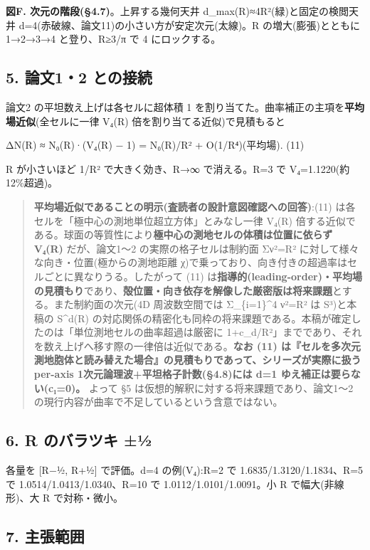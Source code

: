 \documentclass[
]{ltjsarticle}
\begin{document}
\textbf{図F. 次元の階段(§4.7)}。上昇する幾何天井
d\_max(R)≈4R²(緑)と固定の検閲天井
d=4(赤破線、論文11)の小さい方が安定次元(太線)。R の増大(膨張)とともに
1→2→3→4 と登り、R≥3/π で 4 にロックする。

\subsection{5. 論文1・2
との接続}\label{ux8ad6ux658712-ux3068ux306eux63a5ux7d9a}

論文2 の平坦数え上げは各セルに超体積 1
を割り当てた。曲率補正の主項を\textbf{平均場近似}(全セルに一律 V₄(R)
倍を割り当てる近似)で見積もると

ΔN(R) ≈ N₀(R)·(V₄(R) − 1) = N₀(R)/R² + O(1/R⁴)(平均場). (11)

R が小さいほど 1/R² で大きく効き、R→∞ で消える。R=3 で
V₄=1.1220(約12\%超過)。

\begin{quote}
\textbf{平均場近似であることの明示(査読者の設計意図確認への回答)}:(11)
は各セルを「極中心の測地単位超立方体」とみなし一律 V₄(R)
倍する近似である。球面の等質性により\textbf{極中心の測地セルの体積は位置に依らず
V₄(R)} だが、論文1〜2 の実際の格子セルは制約面 Σν²=R²
に対して様々な向き・位置(極からの測地距離
χ)で乗っており、向き付きの超過率はセルごとに異なりうる。したがって (11)
は\textbf{指導的(leading-order)・平均場の見積もり}であり、\textbf{殻位置・向き依存を解像した厳密版は将来課題}とする。また制約面の次元(4D
周波数空間では Σ\_\{i=1\}\^{}4 ν²=R² は S³)と本稿の S\^{}d(R)
の対応関係の精密化も同枠の将来課題である。本稿が確定したのは「単位測地セルの曲率超過は厳密に
1+c\_d/R²」までであり、それを数え上げへ移す際の一律倍は近似である。\textbf{なお
(11)
は『セルを多次元測地胞体と読み替えた場合』の見積もりであって、シリーズが実際に扱う
per-axis 1次元論理波+平坦格子計数(§4.8)には d=1
ゆえ補正は要らない(c₁=0)。} よって §5
は仮想的解釈に対する将来課題であり、論文1〜2
の現行内容が曲率で不足しているという含意ではない。
\end{quote}

\subsection{6. R のバラツキ
±½}\label{r-ux306eux30d0ux30e9ux30c4ux30ad-uxbd}

各量を {[}R−½, R+½{]} で評価。d=4 の例(V₄):R=2 で
1.6835/1.3120/1.1834、R=5 で 1.0514/1.0413/1.0340、R=10 で
1.0112/1.0101/1.0091。小 R で幅大(非線形)、大 R で対称・微小。

\subsection{7. 主張範囲}\label{ux4e3bux5f35ux7bc4ux56f2}
\end{document}

